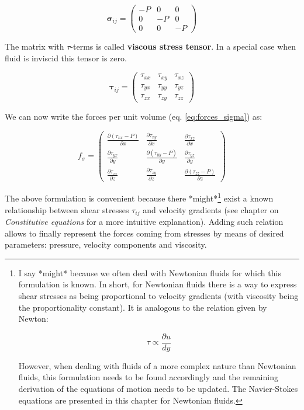 \begin{equation}
\bm{\sigma}_{ij} = \left(
\begin{matrix} 
-P & 0 & 0  \\
0 & -P & 0 \\
0 & 0 & -P 
\end{matrix}
\right)
\end{equation}

The matrix with $\tau$-terms is called \textbf{viscous stress tensor}. In a special case when fluid is inviscid this tensor is zero.

\begin{equation}
\bm{\tau}_{ij} = 
\left(
\begin{matrix} 
\tau_{xx} & \tau_{xy} & \tau_{xz} \\
\tau_{yx} & \tau_{yy} & \tau_{yz} \\
\tau_{zx} & \tau_{zy} & \tau_{zz}
\end{matrix}
\right)
\end{equation}

We can now write the forces per unit volume (eq. \ref{eq:forces_sigma}) as:

\begin{equation} \label{eq:forces_sigma_2}
f_{\sigma} = \left(
\begin{matrix} 
\frac{\partial (\tau_{xx} - P)}{\partial x} & \frac{\partial \tau_{xy}}{\partial x} & \frac{\partial \tau_{xz}}{\partial x} \\
\frac{\partial \tau_{yx}}{\partial y} & \frac{\partial (\tau_{yy} - P)}{\partial y} & \frac{\partial \tau_{yz}}{\partial y} \\
\frac{\partial \tau_{zx}}{\partial z} & \frac{\partial \tau_{zy}}{\partial z} & \frac{\partial (\tau_{zz} - P)}{\partial z}
\end{matrix}
\right)
\end{equation}

The above formulation is convenient because there *might*\footnote{I say *might* because we often deal with Newtonian fluids for which this formulation is known. In short, for Newtonian fluids there is a way to express shear stresses as being proportional to velocity gradients (with viscosity being the proportionality constant). It is analogous to the relation given by Newton:

\begin{equation}
\tau \propto \frac{\partial u}{dy}
\end{equation}

However, when dealing with fluids of a more complex nature than Newtonian fluids, this formulation needs to be found accordingly and the remaining derivation of the equations of motion needs to be updated. The Navier-Stokes equations are presented in this chapter for Newtonian fluids.} exist a known relationship between shear stresses $\tau_{ij}$ and velocity gradients (see chapter on \textit{Constitutive equations} for a more intuitive explanation). Adding such relation allows to finally represent the forces coming from stresses by means of desired parameters: pressure, velocity components and viscosity.




